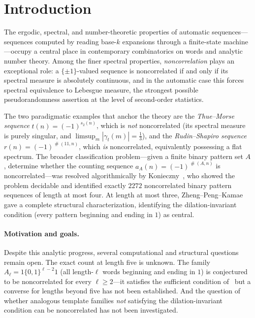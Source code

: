 \documentclass[11pt]{article}
\theoremstyle{definition}
\DeclareMathOperator{\occ}{\#}
\begin{document}
\tableofcontents

\bigskip

\section{Introduction}
\label{sec:intro}

The ergodic, spectral, and number-theoretic properties of automatic
sequences---sequences computed by reading base-$k$ expansions through
a finite-state machine---occupy a central place in contemporary
combinatorics on words and analytic number theory.
Among the finer spectral properties, \emph{noncorrelation} plays an
exceptional role: a $\{\pm 1\}$-valued sequence is noncorrelated if
and only if its spectral measure is absolutely continuous, and in the
automatic case this forces spectral equivalence to Lebesgue measure,
the strongest possible pseudorandomness assertion at the level of
second-order statistics.

The two paradigmatic examples that anchor the theory are the
\emph{Thue--Morse sequence} $t(n) = (-1)^{s_2(n)}$, which is
\emph{not} noncorrelated (its spectral measure is purely singular,
and $\limsup_{m}|\gamma_t(m)| = \tfrac13$), and the
\emph{Rudin--Shapiro sequence} $r(n) = (-1)^{\occ(11,n)}$, which
\emph{is} noncorrelated, equivalently possessing a flat spectrum.
The broader classification problem---given a finite binary pattern set
$A$, determine whether the counting sequence
$a_A(n) = (-1)^{\occ(A,n)}$ is noncorrelated---was resolved
algorithmically by Konieczny~\cite{Kon21}, who showed the problem
decidable and identified exactly $2272$ noncorrelated binary pattern
sequences of length at most four. At length at most three,
Zheng--Peng--Kamae~\cite{ZPK18} gave a complete structural
characterization, identifying the dilation-invariant condition
(every pattern beginning and ending in $1$) as central.

\paragraph{Motivation and goals.}
Despite this analytic progress, several computational and structural
questions remain open. The exact count at length five is unknown.
The family $A_\ell = 1\{0,1\}^{\ell-2}1$ (all length-$\ell$ words
beginning and ending in $1$) is conjectured to be noncorrelated for
every $\ell \geq 2$---it satisfies the sufficient condition of~\cite{Kon21}
but a converse for lengths beyond five has not been established.
And the question of whether analogous template families \emph{not}
satisfying the dilation-invariant condition can be noncorrelated
has not been investigated.
\end{document}
